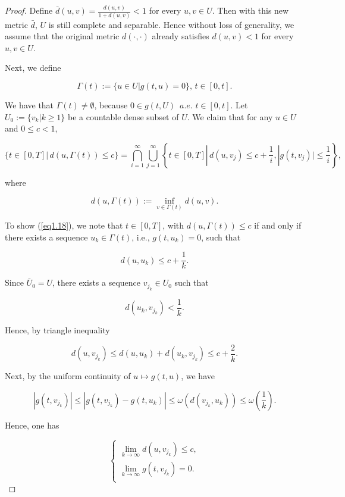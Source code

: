 \begin{proof}
Define $\bar{d}(u,v)=\frac{d(u,v)}{1+d(u,v)}<1$ for every $u,v\in U$. Then with this new metric $\bar{d}$, $U$ is still complete and separable. Hence without loss of generality, we assume that the original metric $d(\cdot,\cdot)$ already satisfies $d(u,v)<1$ for every $u,v \in U$.

Next, we define

\begin{equation*}
\Gamma(t):=\{u\in U | g(t,u)=0\},\, t\in [0,t].
\end{equation*}	

We have that $\Gamma(t)\neq \emptyset$, because $0\in g(t,U)\,\,\,a.e. \,\,t\in [0,t]$. Let $U_0:=\{v_k | k\geq 1\}$ be a countable dense subset of $U$. We claim that for any $u \in U$ and $0\leq c < 1$,

\begin{equation}\label{eq1.18}
\{t\in[0,T] |\, d(u,\Gamma(t))\leq c\}=\bigcap^{\infty}_{i=1}\bigcup^{\infty}_{j=1}\left\{t\in[0,T] |\, d(u,v_j)\leq c+\frac{1}{i},|g(t,v_j)|\leq \frac{1}{i}\right\},
\end{equation}

where 

$$d(u,\Gamma (t)):=\inf_{v\in \Gamma(t)}d(u,v).$$

To show (\ref{eq1.18}), we note that $t\in [0,T]$, with $d(u,\Gamma(t))\leq c$ if and only if there exists a sequence $u_k \in \Gamma(t)$, i.e., $g(t,u_k)=0$, such that

$$d(u,u_k)\leq c+\frac{1}{k}.$$

Since $\bar{U}_0=U$, there exists a sequence $v_{j_k} \in U_0$ such that 

$$d(u_k,v_{j_k})<\frac{1}{k}.$$

Hence, by triangle inequality

$$d(u,v_{j_k})\leq d(u,u_k)+d(u_k,v_{j_k})\leq c+\frac{2}{k}.$$

Next, by the uniform continuity of $u\mapsto g(t,u)$, we have

$$|g(t,v_{j_k})|\leq |g(t,v_{j_k})-g(t,u_k)|\leq \omega(d(v_{j_k},u_k))\leq \omega\left(\frac{1}{k}\right).$$

Hence, one has

$$\left\{ \begin{array}{l}
	\lim_{k\rightarrow \infty} d(u,v_{j_k})\leq c, \\
    \lim_{k\rightarrow \infty} g(t,v_{j_k})=0. \\
\end{array}
\right.$$


\end{proof}

